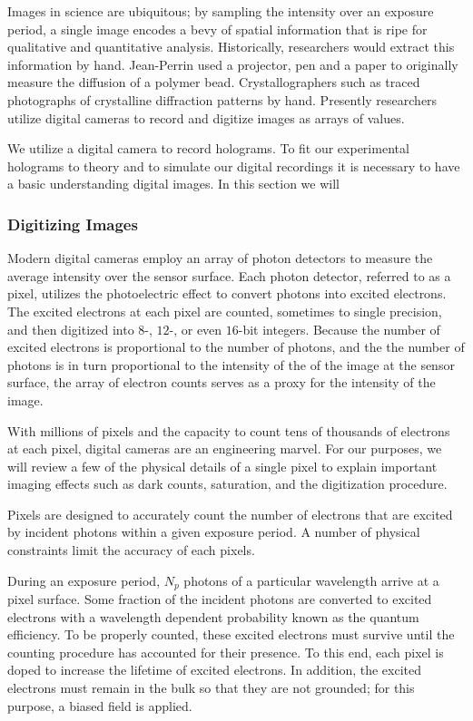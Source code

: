 Images in science are ubiquitous; by sampling the intensity over an exposure
period, a single image encodes a bevy of spatial information that is ripe
for qualitative and quantitative analysis. Historically, researchers would
extract this information by hand. Jean-Perrin used a projector, pen and a paper to originally
measure the diffusion of a polymer bead. Crystallographers such as %
traced photographs of crystalline diffraction patterns by hand. Presently researchers utilize
digital cameras to record and digitize images as arrays of values. 

We utilize a digital camera to record holograms. To fit our experimental holograms to
theory and to simulate our digital recordings it is necessary to have a basic
understanding digital images. In this section we will 

\subsubsection{Digitizing Images}
\label{ch:hvm:sec:hvm:ssec:digitalrec:sssec:digitizing}

Modern digital cameras employ an array of photon detectors to measure the
average intensity over the sensor surface. Each photon detector, referred to as a pixel,
utilizes the photoelectric effect to convert photons into excited electrons.
The excited electrons at each pixel are counted, sometimes to single precision, and
then digitized into $8$-, $12$-, or even $16$-bit integers. Because the number of
excited electrons is proportional to the number of photons, and the the number of
photons is in turn proportional to the intensity of the of the image at the
sensor surface, the array of electron counts serves as a proxy for the intensity
of the image.

With millions of pixels and the capacity to count tens of thousands of electrons at each pixel,
digital cameras are an engineering marvel. For our purposes, we will review a few of the physical
details of a single pixel to explain important imaging effects such as dark counts, saturation,
and the digitization procedure.

Pixels are designed to accurately count the number of electrons that are
excited by incident photons within a given exposure period. A number of physical constraints
limit the accuracy of each pixels.

During an exposure period, $N_p$ photons of a particular wavelength arrive at a pixel
surface. Some fraction of the incident photons are converted to excited electrons
with a wavelength dependent probability known as the quantum efficiency. To be properly
counted, these excited electrons must survive until the counting procedure has
accounted for their presence. To this end, each pixel is doped to increase the lifetime
of excited electrons. In addition, the excited electrons must remain in the bulk so that
they are not grounded; for this purpose, a biased field is applied. %

